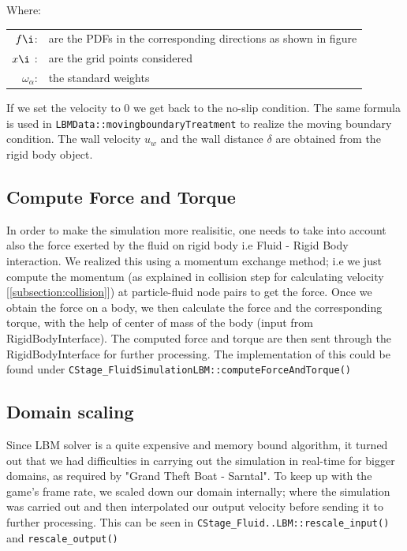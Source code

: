 Where:\\
\hspace*{3em}
\begin{tabular}{rl}
	$f\i$:& are the PDFs in the corresponding directions as shown in figure  \\
	$x\i$ :& are the grid points considered \\
    $\omega_{\alpha}$:& the standard weights \\
\end{tabular}

If we set the velocity to 0 we get back to the no-slip condition. The same formula is used in \texttt{LBMData::movingboundaryTreatment} to realize the
moving boundary condition. The wall velocity $u_w$ and the wall distance $\delta$ 
are obtained from the rigid body object.

\subsection *{Compute Force and Torque}
In order to make the simulation more realisitic, one needs to take into account also the force exerted by the fluid on rigid body i.e Fluid - Rigid Body interaction. We realized this using a momentum exchange method; i.e we just compute the momentum (as explained in collision step for calculating velocity [\ref{subsection:collision}]) at particle-fluid node pairs to get the force.
Once we obtain the force on a body, we then calculate the force and the corresponding torque, with the help of center of mass of the body (input from RigidBodyInterface). The computed force and torque are then sent through the RigidBodyInterface for further processing.
The implementation of this could be found under \texttt{CStage_FluidSimulationLBM::computeForceAndTorque()}

\subsection{Domain scaling}
Since LBM solver is a quite expensive and memory bound algorithm, it turned out that
we had difficulties in carrying out the simulation in real-time for bigger domains, as required by "Grand Theft Boat - Sarntal". To keep up with the game's frame rate, we scaled down our domain internally; where the simulation was carried out and then interpolated our output velocity before sending it to further processing. This can be seen in \texttt{CStage_Fluid..LBM::rescale_input()} and \texttt{rescale_output()}



